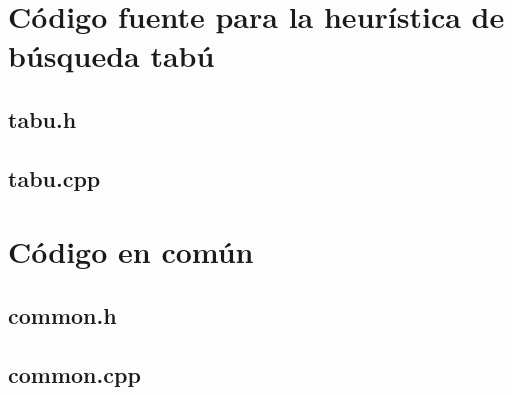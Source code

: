\documentclass[a4paper, 10pt, twoside]{article}
\begin{document}
\newpage

\section{Código fuente para la heurística de búsqueda tabú}


\subsection{tabu.h}




\subsection{tabu.cpp}






\newpage

\section{Código en común}


\subsection{common.h}




\subsection{common.cpp}




\end{document}
